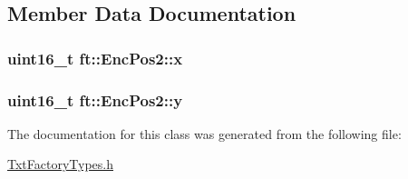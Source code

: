 \subsection{Member Data Documentation}
\subsubsection[{\texorpdfstring{x}{x}}]{\setlength{\rightskip}{0pt plus 5cm}uint16\+\_\+t ft\+::\+Enc\+Pos2\+::x}\hypertarget{classft_1_1_enc_pos2_a072f8a1be35ff117c08f4b82b3eb3b38}{}\label{classft_1_1_enc_pos2_a072f8a1be35ff117c08f4b82b3eb3b38}
\subsubsection[{\texorpdfstring{y}{y}}]{\setlength{\rightskip}{0pt plus 5cm}uint16\+\_\+t ft\+::\+Enc\+Pos2\+::y}\hypertarget{classft_1_1_enc_pos2_ae71ca727428ff924d60efc2281e196dc}{}\label{classft_1_1_enc_pos2_ae71ca727428ff924d60efc2281e196dc}


The documentation for this class was generated from the following file\+:\begin{DoxyCompactItemize}
\item 
\hyperlink{_txt_factory_types_8h}{Txt\+Factory\+Types.\+h}\end{DoxyCompactItemize}
